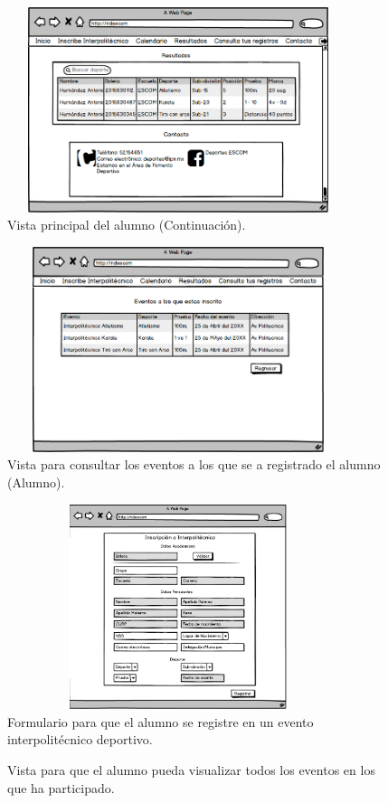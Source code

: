 		\begin{figure} [hbt!]
			\centering
			\includegraphics[width=10cm, height=6cm]{Imagenes/Nuevos/P19_Inicio_paticipante1}
			\caption{Vista principal del alumno (Continuación).}
			\label{principalalum1}
		\end{figure}
	
		\begin{figure} [hbt!]
			\centering
			\includegraphics[width=10cm, height=6cm]{Imagenes/Nuevos/P20_Consulta_Inscripciones}
			\caption{Vista para consultar los eventos a los que se a registrado el alumno (Alumno).}
			\label{consultainscripcion}
		\end{figure}
	\pagebreak
		
		\begin{figure} [hbt!]
			\centering
			\includegraphics[width=10cm, height=6cm]{Imagenes/Disenos/Inscripcioninter}
			\caption{Formulario para que el alumno se registre en un evento interpolitécnico deportivo.}
			\label{Inscripcioninterpolitecnico}
		\end{figure}
		

		\begin{figure} [hbt!]
			\centering
			\caption{Vista para que el alumno pueda visualizar todos los eventos en los que ha participado.}
			\label{historial}
		\end{figure}